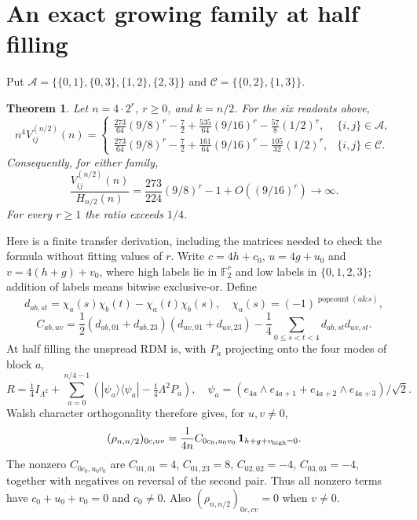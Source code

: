 \documentclass[11pt]{article}
\newtheorem{theorem}{Theorem}
\newcommand{\F}{\mathbb F_2}
\begin{document}
\section{An exact growing family at half filling}
Put $\mathcal A=\{\{0,1\},\{0,3\},\{1,2\},\{2,3\}\}$ and
$\mathcal C=\{\{0,2\},\{1,3\}\}$.
\begin{theorem}\label{half}
Let $n=4\cdot2^r$, $r\geq0$, and $k=n/2$. For the six readouts above,
\begin{equation}
 n^4V^{(n/2)}_{ij}(n)=
 \begin{cases}
 \displaystyle\frac{273}{64}(9/8)^r-\frac72+
       \frac{535}{64}(9/16)^r-\frac{57}{8}(1/2)^r,&\{i,j\}\in\mathcal A,\\[2mm]
 \displaystyle\frac{273}{64}(9/8)^r-\frac72+
       \frac{161}{64}(9/16)^r-\frac{105}{32}(1/2)^r,&\{i,j\}\in\mathcal C.
 \end{cases}\label{half-formula}
\end{equation}
Consequently, for either family,
\[
 \frac{V^{(n/2)}_{ij}(n)}{H_{n/2}(n)}
 =\frac{273}{224}(9/8)^r-1+O((9/16)^r)\longrightarrow\infty.
\]
For every $r\geq1$ the ratio exceeds $1/4$.
\end{theorem}

Here is a finite transfer derivation, including the matrices needed to check the
formula without fitting values of $r$. Write $c=4h+c_0$, $u=4g+u_0$ and
$v=4(h+g)+v_0$, where high labels lie in $\F^r$ and low labels in $\{0,1,2,3\}$;
addition of labels means bitwise exclusive-or. Define
\[
 d_{ab,st}=\chi_a(s)\chi_b(t)-\chi_a(t)\chi_b(s),\quad
 \chi_a(s)=(-1)^{\operatorname{popcount}(a\mathbin{\&}s)},
\]
\[
 C_{ab,uv}=\frac12(d_{ab,01}+d_{ab,23})(d_{uv,01}+d_{uv,23})
             -\frac14\sum_{0\leq s<t<4}d_{ab,st}d_{uv,st}.
\]
At half filling the unspread RDM is, with $P_a$ projecting onto the four modes of block $a$,
\[
 R=\tfrac14 I_{\Lambda^2}+
   \sum_{a=0}^{n/4-1}(|\psi_a\rangle\langle\psi_a|-\tfrac14\Lambda^2P_a),
 \quad \psi_a=(e_{4a}\wedge e_{4a+1}+e_{4a+2}\wedge e_{4a+3})/\sqrt2.
\]
Walsh character orthogonality therefore gives, for $u,v\ne0$,
\begin{equation}
 (\rho_{n,n/2})_{0c,uv}
  =\frac{1}{4n}C_{0c_0,u_0v_0}\,
       \mathbf1_{h+g+v_{\rm high}=0}.\label{rdm-half}
\end{equation}
The nonzero $C_{0c_0,u_0v_0}$ are
$C_{01,01}=4$, $C_{01,23}=8$, $C_{02,02}=-4$, $C_{03,03}=-4$,
together with negatives on reversal of the second pair. Thus all nonzero
terms have $c_0+u_0+v_0=0$ and $c_0\ne0$.
Also $(\rho_{n,n/2})_{0c,cv}=0$ when $v\ne0$.
\end{document}
